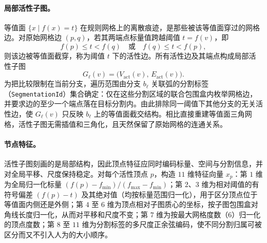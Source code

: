 \documentclass[twocolumn, a4paper, 10pt]{article}
\begin{document}
\paragraph{局部活性子图。}等值面 $\{x\mid f(x)=t\}$ 在规则网格上的离散痕迹，是那些被该等值面穿过的网格边。对原始网格边 $(p,q)$，若其两端点标量值跨越阈值 $t=f(v)$，即
\begin{equation}
f(p)\leq t<f(q)\quad\text{或}\quad f(q)\leq t<f(p),
\label{eq:active}
\end{equation}
则该边被等值面截穿，称为阈值 $t$ 下的活性边。所有活性边及其端点构成局部活性子图
\begin{equation}
G_\ell(v)=\bigl(V_{\mathrm{act}}(v),\,E_{\mathrm{act}}(v)\bigr).
\end{equation}
为把比较限制在当前分支，遍历范围由分支 $b_\ell$ 关联弧的分割标签（\texttt{SegmentationId}）集合确定：仅在这些分割区域的联合包围盒内枚举网格边，并要求边的至少一个端点落在目标分割内。由此排除同一阈值下其他分支的无关活性边，使 $G_\ell(v)$ 只反映 $b_\ell$ 上的等值面截交结构。相比直接重建等值面三角网格，活性子图无需插值和三角化，且天然保留了原始网格的连通关系。

\paragraph{节点特征。}活性子图刻画的是局部结构，因此顶点特征应同时编码标量、空间与分割信息，并对全局平移、尺度保持稳定。对每个活性顶点 $p$，构造 $11$ 维特征向量 $x_p$：第 $1$ 维为全局归一化标量 $(f(p)-f_{\min})/(f_{\max}-f_{\min})$；第 $2$、$3$ 维为相对阈值的有符号偏差 $(f(p)-t)$ 及其绝对值（均按标量范围归一化），用于区分顶点位于等值面内侧还是外侧；第 $4$ 至 $6$ 维为顶点相对子图质心的坐标，按子图包围盒对角线长度归一化，从而对平移和尺度不变；第 $7$ 维为按最大网格度数（$6$）归一化的顶点度数；第 $8$ 至 $11$ 维为分割标签的多尺度正余弦编码，使不同分割归属可被区分而又不引入人为的大小顺序。
\end{document}
